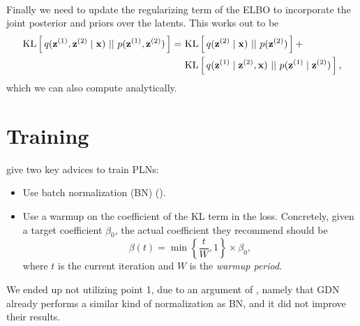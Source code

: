 \paragraph{}
Finally we need to update the regularizing term of the ELBO to incorporate the
joint posterior and priors over the latents. This works out to be
\begin{align*}
  \mathrm{KL}\left[\,q(\mathbf{z}^{(1)}, \mathbf{z}^{(2)} \mid \mathbf{x})\,\,||\,\,p(\mathbf{z}^{(1)}, \mathbf{z}^{(2)})\,\right] =\,\,& 
  \mathrm{KL}\left[\,q(\mathbf{z}^{(2)} \mid \mathbf{x})\,\,||\,\,p(\mathbf{z}^{(2)})\,\right] + \\
  &\mathrm{KL}\left[\,q(\mathbf{z}^{(1)} \mid \mathbf{z}^{(2)} , \mathbf{x})\,\,||\,\,p(\mathbf{z}^{(1)} \mid \mathbf{z}^{(2)})\,\right],
\end{align*}
which we can also compute analytically.

\section{Training}
\par \cite{sonderby2016train} give two key advices to train PLNs:
\begin{itemize}
\item Use batch normalization (BN) (\cite{ioffe2015batch}).
\item Use a warmup on the coefficient of the KL term in the loss.
  Concretely, given a target coefficient $\beta_0$, the actual coefficient they
  recommend should be
  \[
    \beta(t) = \min\left\{ \frac{t}{W}, 1 \right\} \times \beta_0,
  \]
  where $t$ is the current iteration and $W$ is the \textit{warmup period}.
\end{itemize} 
We ended up not utilizing point 1, due to an argument of
\cite{balle2018variational}, namely that GDN already performs a similar kind of
normalization as BN, and it did not improve their results. 

